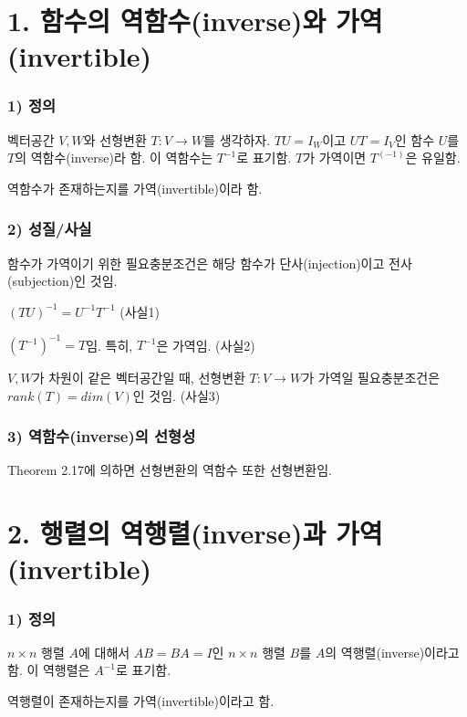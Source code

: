 \section*{1. 함수의 역함수(inverse)와 가역(invertible)}

\subsubsection*{1) 정의\\}
\begin{DEF}
벡터공간 $V,W$와 선형변환 $T:V \rightarrow W$를 생각하자. $TU=I_W$이고 $UT=I_V$인 함수 $U$를 $T$의 역함수(inverse)라 함. 이 역함수는 $T^{-1}$로 표기함. $T$가 가역이면 $T^(-1)$은 유일함.

역함수가 존재하는지를 가역(invertible)이라 함.
\end{DEF}

\subsubsection*{2) 성질/사실}
함수가 가역이기 위한 필요충분조건은 해당 함수가 단사(injection)이고 전사(subjection)인 것임.

$(TU)^{-1}=U^{-1}T^{-1}$ (사실1)

$(T^{-1})^{-1}=T$임. 특히, $T^{-1}$은 가역임. (사실2)

$V,W$가 차원이 같은 벡터공간일 때, 선형변환 $T:V \rightarrow W$가 가역일 필요충분조건은 $rank(T)=dim(V)$인 것임. (사실3)

\subsubsection*{3) 역함수(inverse)의 선형성}
Theorem 2.17에 의하면 선형변환의 역함수 또한 선형변환임.\\


\section*{2. 행렬의 역행렬(inverse)과 가역(invertible)}
\subsubsection*{1) 정의\\}
\begin{DEF}
$n \times n$ 행렬 $A$에 대해서 $AB=BA=I$인 $n \times n$ 행렬 $B$를 $A$의 역행렬(inverse)이라고 함. 이 역행렬은 $A^{-1}$로 표기함.

역행렬이 존재하는지를 가역(invertible)이라고 함.
\end{DEF}

